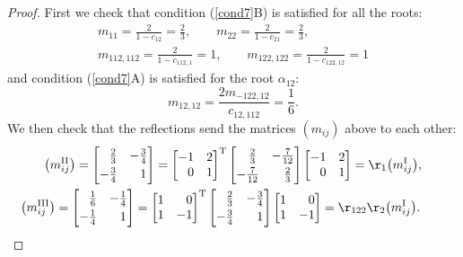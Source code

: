 \documentclass[10pt,a4paper]{amsart}
\numberwithin{equation}{section}
\begin{document}
\begin{proof}
First we check that condition (\ref{cond7}B) is satisfied for all the roots:
\begin{gather*}
m_{11} = \frac{2}{1-c_{12}} = \frac{2}{3}, \qquad
m_{22} = \frac{2}{1-c_{21}} = \frac{2}{3}, \\
m_{112,112} = \frac{2}{1-c_{112,1}} = 1, \qquad
m_{122,122} = \frac{2}{1-c_{122,12}} = 1
\end{gather*}
and condition (\ref{cond7}A) is satisfied for the root $\alpha_{12}$:
\[m_{12,12} = \frac{2m_{-122,12}}{c_{12,112}} = \frac{1}{6}.\]
We then check that the reflections send the matrices $(m_{ij})$ above to each other:
\begin{gather*}
\big(m_{ij}^{\mathrm{II}}\big) =\begin{bmatrix}
 \hphantom{-}\frac{2}{3} & -\frac{3}{4}\vspace{1mm}\\
 -\frac{3}{4} & \hphantom{-}1
\end{bmatrix} =
\begin{bmatrix}
 -1 & 2\\
\hphantom{-}0 & 1
\end{bmatrix}^{\rm T}
\begin{bmatrix}
 \hphantom{-}\frac{2}{3} & -\frac{7}{12}\vspace{1mm}\\
 -\frac{7}{12} & \hphantom{-}\frac{2}{3}
\end{bmatrix}
\begin{bmatrix}
 -1 & 2\\
 \hphantom{-}0 & 1
\end{bmatrix} = \r_1 \big(m_{ij}^{\mathrm{I}}\big),\\
\big(m_{ij}^{\mathrm{III}}\big)=\begin{bmatrix}
 \hphantom{-}\frac{1}{6} & -\frac{1}{4}\vspace{1mm}\\
 -\frac{1}{4} & \hphantom{-}1
\end{bmatrix} =
\begin{bmatrix}
 1 & \hphantom{-}0\\
 1 & -1
\end{bmatrix}^{\rm T}
\begin{bmatrix}
\hphantom{-}\frac{2}{3} & -\frac{3}{4}\vspace{1mm}\\
 -\frac{3}{4} & \hphantom{-}1
\end{bmatrix}
\begin{bmatrix}
 1 & \hphantom{-}0\\
 1 & -1
\end{bmatrix} = \r_{122} \r_2 \big(m_{ij}^{\mathrm{I}}\big).\tag*{\qed}
\end{gather*}\renewcommand{\qed}{}
\end{proof}
\end{document}
